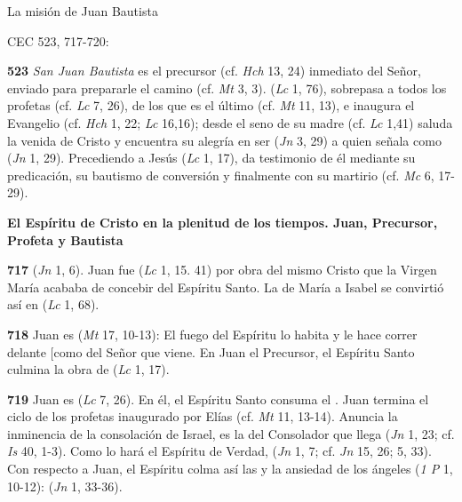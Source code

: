 La misión de Juan Bautista

CEC 523, 717-720:

\textbf{523} \emph{San Juan Bautista} es el precursor (cf. \emph{Hch} 13, 24) inmediato del Señor, enviado para prepararle el camino (cf. \emph{Mt} 3, 3).  (\emph{Lc} 1, 76), sobrepasa a todos los profetas (cf. \emph{Lc} 7, 26), de los que es el último (cf. \emph{Mt} 11, 13), e inaugura el Evangelio (cf. \emph{Hch} 1, 22; \emph{Lc} 16,16); desde el seno de su madre (cf. \emph{Lc} 1,41) saluda la venida de Cristo y encuentra su alegría en ser  (\emph{Jn} 3, 29) a quien señala como  (\emph{Jn} 1, 29). Precediendo a Jesús  (\emph{Lc} 1, 17), da testimonio de él mediante su predicación, su bautismo de conversión y finalmente con su martirio (cf. \emph{Mc} 6, 17-29).

\textbf{El Espíritu de Cristo en la plenitud de los tiempos. Juan, Precursor, Profeta y Bautista}

\textbf{717}  (\emph{Jn} 1, 6). Juan fue  (\emph{Lc} 1, 15. 41) por obra del mismo Cristo que la Virgen María acababa de concebir del Espíritu Santo. La  de María a Isabel se convirtió así en  (\emph{Lc} 1, 68).

\textbf{718} Juan es  (\emph{Mt} 17, 10-13): El fuego del Espíritu lo habita y le hace correr delante {[}como \textquote{precursor}{]} del Señor que viene. En Juan el Precursor, el Espíritu Santo culmina la obra de  (\emph{Lc} 1, 17).

\textbf{719} Juan es  (\emph{Lc} 7, 26). En él, el Espíritu Santo consuma el . Juan termina el ciclo de los profetas inaugurado por Elías (cf. \emph{Mt} 11, 13-14). Anuncia la inminencia de la consolación de Israel, es la  del Consolador que llega (\emph{Jn} 1, 23; cf. \emph{Is} 40, 1-3). Como lo hará el Espíritu de Verdad,  (\emph{Jn} 1, 7; cf. \emph{Jn} 15, 26; 5, 33). Con respecto a Juan, el Espíritu colma así las  y la ansiedad de los ángeles (\emph{1 P} 1, 10-12):  (\emph{Jn} 1, 33-36).

